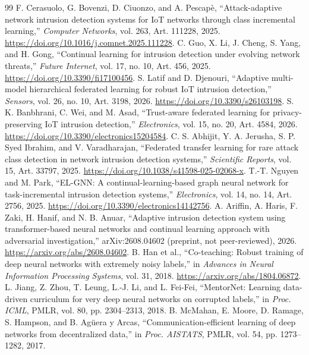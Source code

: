 \documentclass[10pt,a4paper]{article}
\begin{document}
\begin{thebibliography}{99}
 F. Cerasuolo, G. Bovenzi, D. Ciuonzo, and A. Pescapè, \enquote{Attack-adaptive network intrusion detection systems for IoT networks through class incremental learning,} \emph{Computer Networks}, vol. 263, Art. 111228, 2025. \url{https://doi.org/10.1016/j.comnet.2025.111228}.
 C. Guo, X. Li, J. Cheng, S. Yang, and H. Gong, \enquote{Continual learning for intrusion detection under evolving network threats,} \emph{Future Internet}, vol. 17, no. 10, Art. 456, 2025. \url{https://doi.org/10.3390/fi17100456}.
 S. Latif and D. Djenouri, \enquote{Adaptive multi-model hierarchical federated learning for robust IoT intrusion detection,} \emph{Sensors}, vol. 26, no. 10, Art. 3198, 2026. \url{https://doi.org/10.3390/s26103198}.
 S. K. Banbhrani, C. Wei, and M. Asad, \enquote{Trust-aware federated learning for privacy-preserving IoT intrusion detection,} \emph{Electronics}, vol. 15, no. 20, Art. 4584, 2026. \url{https://doi.org/10.3390/electronics15204584}.
 C. S. Abhijit, Y. A. Jerusha, S. P. Syed Ibrahim, and V. Varadharajan, \enquote{Federated transfer learning for rare attack class detection in network intrusion detection systems,} \emph{Scientific Reports}, vol. 15, Art. 33797, 2025. \url{https://doi.org/10.1038/s41598-025-02068-x}.
 T.-T. Nguyen and M. Park, \enquote{EL-GNN: A continual-learning-based graph neural network for task-incremental intrusion detection systems,} \emph{Electronics}, vol. 14, no. 14, Art. 2756, 2025. \url{https://doi.org/10.3390/electronics14142756}.
 A. Ariffin, A. Haris, F. Zaki, H. Hanif, and N. B. Anuar, \enquote{Adaptive intrusion detection system using transformer-based neural networks and continual learning approach with adversarial investigation,} arXiv:2608.04602 (preprint, not peer-reviewed), 2026. \url{https://arxiv.org/abs/2608.04602}.
 B. Han et al., \enquote{Co-teaching: Robust training of deep neural networks with extremely noisy labels,} in \emph{Advances in Neural Information Processing Systems}, vol. 31, 2018. \url{https://arxiv.org/abs/1804.06872}.
 L. Jiang, Z. Zhou, T. Leung, L.-J. Li, and L. Fei-Fei, \enquote{MentorNet: Learning data-driven curriculum for very deep neural networks on corrupted labels,} in \emph{Proc. ICML}, PMLR, vol. 80, pp. 2304--2313, 2018.
 B. McMahan, E. Moore, D. Ramage, S. Hampson, and B. Ag\"uera y Arcas, \enquote{Communication-efficient learning of deep networks from decentralized data,} in \emph{Proc. AISTATS}, PMLR, vol. 54, pp. 1273--1282, 2017.

\end{thebibliography}
\end{document}
